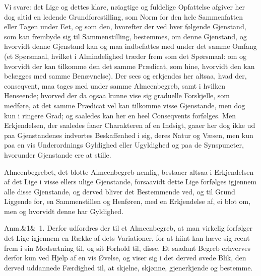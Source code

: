 \documentclass[12pt]{book}
\def\sperr#1{#1}%
\def\textit#1{#1}%
\def\emph#1{#1}%
\newcommand{\sperr}[1]{\textls[180]{#1}}
\newcommand{\anm}[1]{%
  \par\vspace{0.5\baselineskip}%
  \noindent\hspace{\parindent}\sperr{Anm.}\ifx&#1&\else~\textit{#1}.\fi
  \enspace\ignorespaces
}
\newcommand{\opage}[1]{\marginnote{\footnotesize\textit{[#1]}}}
\begin{document}
Vi svare: det Lige og dettes klare, nøiagtige og fuldelige Opfattelse afgiver her
dog altid en ledende Grundforestilling, som \emph{Norm} for den hele Sammenfatten
eller Tagen under Eet, og som den, hvorefter der ved hver følgende Gjenstand, som
kan frembyde sig til Sammenstilling,
\opage{189} bestemmes, om denne Gjenstand, og hvorvidt denne Gjenstand kan og maa indbefattes
med under det samme Omfang (et Spørsmaal, hvilket i Almindelighed træder frem som
det Spørsmaal: om og hvorvidt der kan tilkomme den det samme \emph{Prædicat}, som
hine, hvorvidt den kan belægges med samme Benævnelse). Der sees og erkjendes her
altsaa, hvad der, \emph{conseqvent}, maa tages med under samme Almeenbegreb, samt i
hvilken Henseende; hvorved der da ogsaa kunne vise sig graduelle Forskjelle, som
medføre, at det samme \emph{Prædicat} vel kan tilkomme visse Gjenstande, men dog kun
i ringere Grad; og saaledes kan her en heel \emph{Conseqvents} forfølges. Men
Erkjendelsen, der saaledes faaer Charakteren af en \emph{Indsigt}, gaaer her dog
ikke ud paa Gjenstandenes indvortes Beskaffenhed i sig, deres Natur og Væsen, men
kun paa en vis \emph{Underordnings Gyldighed eller Ugyldighed} og paa de
\emph{Synspuncter}, hvorunder Gjenstande ere at stille.

\emph{Almeenbegrebet}, det blotte \emph{Almeenbegreb} nemlig, bestaaer altsaa i
Erkjendelsen af det Lige i visse ellers ulige Gjenstande, forsaavidt dette Lige
forfølges igjennem alle disse Gjenstande, og derved bliver det Bestemmende ved, og
til Grund Liggende for, en Sammenstillen og Henføren, med en Erkjendelse af, ei blot
om, men og hvorvidt denne har Gyldighed.

\anm{1} Derfor udfordres der til et Almeenbegreb, at man virkelig forfølger det Lige
\opage{190} igjennem en Række af dets Variationer, for at hiint kan hæve sig reent frem i sin
Modsætning til, og sit Forhold til, disse. Et saadant Begreb erhverves derfor kun ved
Hjelp af en vis Øvelse, og viser sig i det derved øvede Blik, den derved uddannede
Færdighed til, at skjelne, skjønne, gjenerkjende og bestemme.
\end{document}
